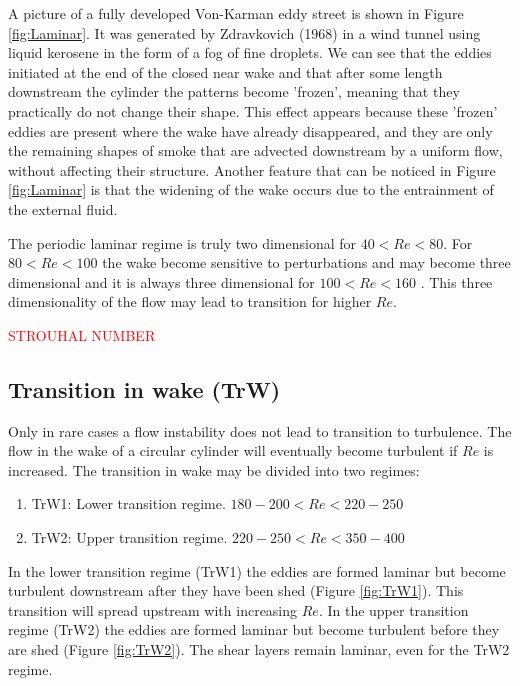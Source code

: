 \documentclass[journal]{new-aiaa}
\begin{document}
A picture of a fully developed Von-Karman eddy street is shown in Figure \ref{fig:Laminar}. It was generated by Zdravkovich (1968) \citep{Zdravkovich1968} in a wind tunnel using liquid kerosene in the form of a fog of fine droplets. We can see that the eddies initiated at the end of the closed near wake and that after some length downstream the cylinder the patterns become 'frozen', meaning that they practically do not change their shape. This effect appears because these 'frozen' eddies are present where the wake have already disappeared, and they are only the remaining shapes of smoke that are advected downstream by a uniform flow, without affecting their structure. Another feature that can be noticed in Figure \ref{fig:Laminar} is that the widening of the wake occurs due to the entrainment of the external fluid.

The periodic laminar regime is truly two dimensional for $40<Re<80$. For  $80<Re<100$ the wake become sensitive to perturbations and may become three dimensional and it is always three dimensional for  $100<Re<160$ \cite{Phillips1956}. This three dimensionality of the flow may lead to transition for higher $Re$.

\Huge{\textcolor{red}{STROUHAL NUMBER}}

\normalsize



\subsection{Transition in wake (TrW)}

Only in rare cases a flow instability does not lead to transition to turbulence. The flow in the wake of a circular cylinder will eventually become turbulent if $Re$ is increased. The transition in wake may be divided into two regimes:

\begin{enumerate}[label=(\roman*)]
\item TrW1: Lower transition regime. $180-200<Re<220-250$
\item TrW2: Upper transition regime. $220-250<Re<350-400$
\end{enumerate}

In the lower transition regime (TrW1) the eddies are formed laminar but become turbulent downstream after they have been shed (Figure \ref{fig:TrW1}). This transition will spread upstream with increasing $Re$. In the upper transition regime (TrW2) the eddies are formed laminar but become turbulent before they are shed (Figure \ref{fig:TrW2}). The shear layers remain laminar, even for the TrW2 regime.
\end{document}
